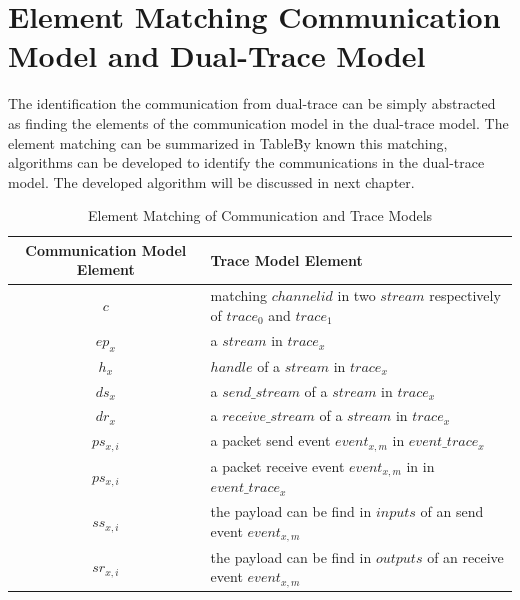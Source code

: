 \section{Element Matching Communication Model and Dual-Trace Model}
The identification the communication from dual-trace can be simply abstracted as finding the elements of the communication model in the dual-trace model. The element matching can be summarized in Table\. By known this matching, algorithms can be developed to identify the communications in the dual-trace model. The developed algorithm will be discussed in next chapter.
\begin{table}[H]
\centering
\caption{Element Matching of Communication and Trace Models}
\label{methodsInCategories}
\begin{tabular}{|c|l|}
 \hline
\textbf{Communication Model Element}& \textbf{Trace Model Element}\\
 \hline
$c$ & matching $channelid$ in two $stream$ respectively of $trace_{0}$ and $trace_{1}$  \\
 \hline
$ep_{x}$ & a $stream$ in $trace_{x}$ \\
 \hline
$h_{x}$ & $handle$ of a $stream$ in $trace_{x}$\\
 \hline
$ds_{x}$ & a $send\_stream$ of a $stream$ in $trace_{x}$ \\
 \hline
$dr_{x}$ & a $receive\_stream$ of a $stream$ in $trace_{x}$\\
 \hline
$ps_{x,i}$ & a packet send event $event_{x,m}$ in $event\_trace_{x}$\\
 \hline
$ps_{x,i}$ & a packet receive event $event_{x,m}$ in in $event\_trace_{x}$\\
 \hline
$ss_{x,i}$ & the payload can be find in $inputs$ of an send event $event_{x,m}$\\
 \hline
$sr_{x,i}$ & the payload can be find in $outputs$ of an receive event $event_{x,m}$\\
 \hline
\end{tabular}
\end{table}


